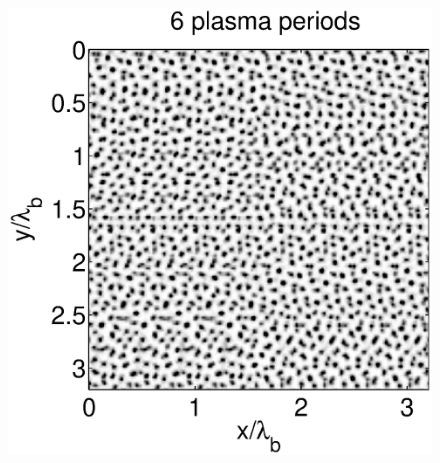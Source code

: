 \documentclass[conference]{IEEEtran}
\renewcommand{\~}{\widetilde }
\begin{document}
\begin{figure}[H]
\begin{center}
\begin{minipage}{0.40\columnwidth}
\begin{center}
		\end{center}
	\end{minipage}%
	\begin{minipage}{0.40\columnwidth}
		\begin{center}
			\includegraphics[width=1.0\columnwidth]{m__6_EXP.eps}
		\end{center}
	\end{minipage}%
	\\
	\begin{minipage}{0.40\columnwidth}
		\begin{center}

\end{center}
\end{minipage}
\end{center}
\end{figure}
\end{document}
